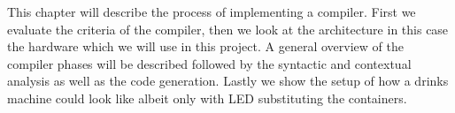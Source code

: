 This chapter will describe the process of implementing a compiler. First we evaluate the criteria of the compiler, then we look at the architecture in this case the hardware which we will use in this project. A general overview of the compiler phases will be described followed by the syntactic and contextual analysis as well as the code generation. Lastly we show the setup of how a drinks machine could look like albeit only with LED substituting the containers.